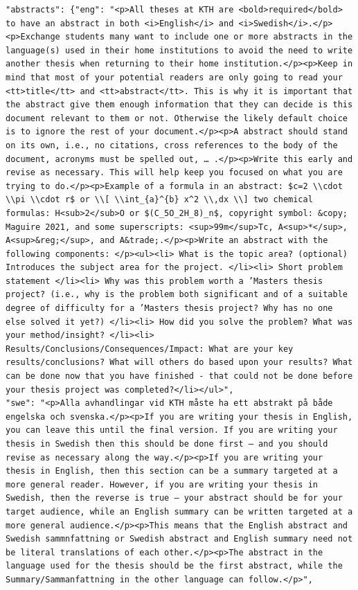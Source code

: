 \begin{lstlisting}
"abstracts": {"eng": "<p>All theses at KTH are <bold>required</bold> to have an abstract in both <i>English</i> and <i>Swedish</i>.</p><p>Exchange students many want to include one or more abstracts in the language(s) used in their home institutions to avoid the need to write another thesis when returning to their home institution.</p><p>Keep in mind that most of your potential readers are only going to read your <tt>title</tt> and <tt>abstract</tt>. This is why it is important that the abstract give them enough information that they can decide is this document relevant to them or not. Otherwise the likely default choice is to ignore the rest of your document.</p><p>A abstract should stand on its own, i.e., no citations, cross references to the body of the document, acronyms must be spelled out, … .</p><p>Write this early and revise as necessary. This will help keep you focused on what you are trying to do.</p><p>Example of a formula in an abstract: $c=2 \\cdot \\pi \\cdot r$ or \\[ \\int_{a}^{b} x^2 \\,dx \\] two chemical formulas: H<sub>2</sub>O or $(C_5O_2H_8)_n$, copyright symbol: &copy; Maguire 2021, and some superscripts: <sup>99m</sup>Tc, A<sup>*</sup>, A<sup>&reg;</sup>, and A&trade;.</p><p>Write an abstract with the following components: </p><ul><li> What is the topic area? (optional) Introduces the subject area for the project. </li><li> Short problem statement </li><li> Why was this problem worth a ’Masters thesis project? (i.e., why is the problem both significant and of a suitable degree of difficulty for a ’Masters thesis project? Why has no one else solved it yet?) </li><li> How did you solve the problem? What was your method/insight? </li><li> Results/Conclusions/Consequences/Impact: What are your key results/conclusions? What will others do based upon your results? What can be done now that you have finished - that could not be done before your thesis project was completed?</li></ul>",
"swe": "<p>Alla avhandlingar vid KTH måste ha ett abstrakt på både engelska och svenska.</p><p>If you are writing your thesis in English, you can leave this until the final version. If you are writing your thesis in Swedish then this should be done first – and you should revise as necessary along the way.</p><p>If you are writing your thesis in English, then this section can be a summary targeted at a more general reader. However, if you are writing your thesis in Swedish, then the reverse is true – your abstract should be for your target audience, while an English summary can be written targeted at a more general audience.</p><p>This means that the English abstract and Swedish sammnfattning or Swedish abstract and English summary need not be literal translations of each other.</p><p>The abstract in the language used for the thesis should be the first abstract, while the Summary/Sammanfattning in the other language can follow.</p>",

\end{lstlisting}
